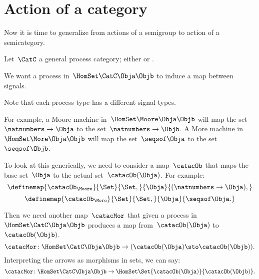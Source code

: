 \section{Action of a category}




Now it is time to generalize from actions of a semigroup to action of a semicategory.

Let~$\CatC$ a general process category; either \Moore or \More. %

We want a process in~$\HomSet\CatC\Obja\Objb$ to induce a map between signals.

Note that each process type has a different signal types.

For example, a Moore machine in~$\HomSet\Moore\Obja\Objb$ will map the set~$\natnumbers \to \Obja$ to the set~$\natnumbers \to \Objb$.
A More machine in~$\HomSet\More\Obja\Objb$  will map the set~$\seqsof \Obja$ to the set~$\seqsof \Objb$.

To look at this generically, we need to consider a map~$\catacOb$ that maps the base set~$\Obja$ to the actual set~$\catacOb(\Obja)$. For example:
%
\begin{equation}
    \definemap{\catacOb_{\Moore}}{\Set}{\Set,}{\Obja}{(\natnumbers \to \Obja),}
\end{equation}
%
\begin{equation}
    \definemap{\catacOb_{\More}}{\Set}{\Set,}{\Obja}{\seqsof \Obja.}
\end{equation}

Then we need another map~$\catacMor$ that given a process in~$\HomSet\CatC\Obja\Objb$ produces a map from~$\catacOb(\Obja)$ to~$\catacOb(\Objb)$.
%
\begin{equation}
    \label{eq:gamma-1}
    \catacMor\colon \HomSet\CatC\Obja\Objb \to  (\catacOb(\Obja) \sto \catacOb(\Objb)).
\end{equation}
%
Interpreting the arrows as morphisms in sets, we can say:
%
\begin{equation}
    \label{eq:gamma-2}
    \catacMor\colon \HomSet\CatC\Obja\Objb \to  \HomSet\Set{\catacOb(\Obja)}{\catacOb(\Objb) }.
\end{equation}



